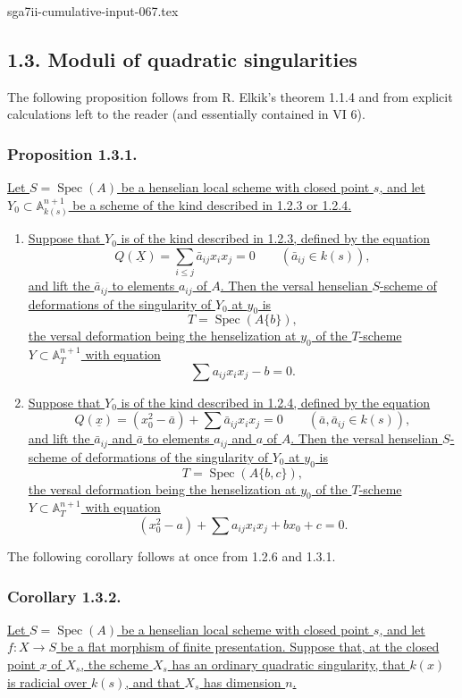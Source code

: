 \begin{filecontents*}{sga7ii-cumulative-input-067.tex}
\subsection*{1.3. Moduli of quadratic singularities}

The following proposition follows from R. Elkik's theorem 1.1.4 and
from explicit calculations left to the reader (and essentially
contained in VI 6).

\subsubsection*{Proposition 1.3.1.}
\underline{Let $S=\operatorname{Spec}(A)$ be a henselian local scheme
with closed point $s$, and let
$Y_0\subset\mathbb A_{k(s)}^{n+1}$ be a scheme of the kind described
in 1.2.3 or 1.2.4.}

\begin{enumerate}[label=(\roman*),leftmargin=2.6em]
\item \underline{Suppose that $Y_0$ is of the kind described in
1.2.3, defined by the equation}
\[
Q(\underline X)=\sum_{i\leq j}\bar a_{ij}x_i x_j=0
\qquad(\bar a_{ij}\in k(s)),
\]
\underline{and lift the $\bar a_{ij}$ to elements $a_{ij}$ of $A$.
Then the versal henselian $S$-scheme of deformations of the
singularity of $Y_0$ at $y_0$ is}
\[
T=\operatorname{Spec}(A\{b\}),
\]
\underline{the versal deformation being the henselization at $y_0$
of the $T$-scheme $Y\subset\mathbb A_T^{n+1}$ with equation}
\[
\sum a_{ij}x_i x_j-b=0.
\]

\item \underline{Suppose that $Y_0$ is of the kind described in
1.2.4, defined by the equation}
\[
Q(\underline x)=(x_0^2-\bar a)+\sum\bar a_{ij}x_i x_j=0
\qquad(\bar a,\bar a_{ij}\in k(s)),
\]
\underline{and lift the $\bar a_{ij}$ and $\bar a$ to elements
$a_{ij}$ and $a$ of $A$.  Then the versal henselian $S$-scheme of
deformations of the singularity of $Y_0$ at $y_0$ is}
\[
T=\operatorname{Spec}(A\{b,c\}),
\]
\underline{the versal deformation being the henselization at $y_0$
of the $T$-scheme $Y\subset\mathbb A_T^{n+1}$ with equation}
\[
(x_0^2-a)+\sum a_{ij}x_i x_j+b x_0+c=0.
\]
\end{enumerate}

The following corollary follows at once from 1.2.6 and 1.3.1.

\subsubsection*{Corollary 1.3.2.}
\underline{Let $S=\operatorname{Spec}(A)$ be a henselian local
scheme with closed point $s$, and let $f:X\to S$ be a flat morphism
of finite presentation.  Suppose that, at the closed point $x$ of
$X_s$, the scheme $X_s$ has an ordinary quadratic singularity, that
$k(x)$ is radicial over $k(s)$, and that $X_s$ has dimension $n$.}


\end{filecontents*}
